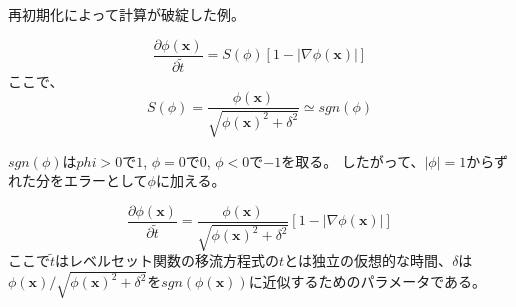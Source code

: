 再初期化によって計算が破綻した例\cite{Shono2017}。

\begin{equation}
\label{levelset-reinitialization}
	\frac{\partial \phi (\bm{x})}{\partial \tilde{t}} = S(\phi)[1-|\nabla \phi (\bm{x})|]
\end{equation}
ここで、
\begin{equation}
\label{levelset-reinitialization}
	S(\phi) = \frac{\phi (\bm{x})}{\sqrt{\phi(\bm{x})^2 + \delta^2}} \simeq sgn(\phi)
\end{equation}

$sgn(\phi)$は$phi>0$で$1$, $\phi=0$で$0$, $\phi<0$で$-1$を取る。
したがって、$|\phi|=1$からずれた分をエラーとして$\phi$に加える。

\begin{equation}
\label{levelset-reinitialization}
	\frac{\partial \phi (\bm{x})}{\partial \tilde{t}} = \frac{\phi (\bm{x})}{\sqrt{\phi(\bm{x})^2 + \delta^2}}[1-|\nabla \phi (\bm{x})|]
\end{equation}
ここで$\tilde{t}$はレベルセット関数の移流方程式の$t$とは独立の仮想的な時間、$\delta$は$\phi(\bm{x})/\sqrt{\phi(\bm{x})^2+\delta^2}$を$sgn(\phi(\bm{x}))$に近似するためのパラメータである。

